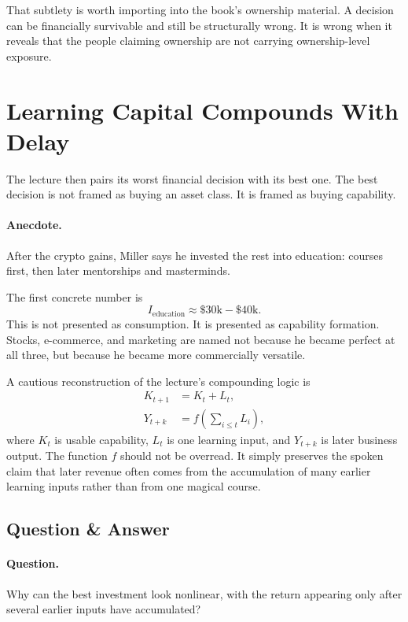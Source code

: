 \documentclass[11pt,oneside]{book}
\begin{document}
That subtlety is worth importing into the book's ownership material. A decision can be financially survivable and still be structurally wrong. It is wrong when it reveals that the people claiming ownership are not carrying ownership-level exposure.

\section{Learning Capital Compounds With Delay}

The lecture then pairs its worst financial decision with its best one. The best decision is not framed as buying an asset class. It is framed as buying capability.

\paragraph{Anecdote.}
After the crypto gains, Miller says he invested the rest into education: courses first, then later mentorships and masterminds.

The first concrete number is
\[
I_{\text{education}} \approx \$30\text{k}-\$40\text{k}.
\]
This is not presented as consumption. It is presented as capability formation. Stocks, e-commerce, and marketing are named not because he became perfect at all three, but because he became more commercially versatile.

A cautious reconstruction of the lecture's compounding logic is
\begin{align}
K_{t+1} &= K_t + L_t,\\
Y_{t+k} &= f\!\left(\sum_{i\le t} L_i\right),
\end{align}
where \(K_t\) is usable capability, \(L_t\) is one learning input, and \(Y_{t+k}\) is later business output. The function \(f\) should not be overread. It simply preserves the spoken claim that later revenue often comes from the accumulation of many earlier learning inputs rather than from one magical course.

\subsection{Question \& Answer}

\paragraph{Question.}
Why can the best investment look nonlinear, with the return appearing only after several earlier inputs have accumulated?
\end{document}
